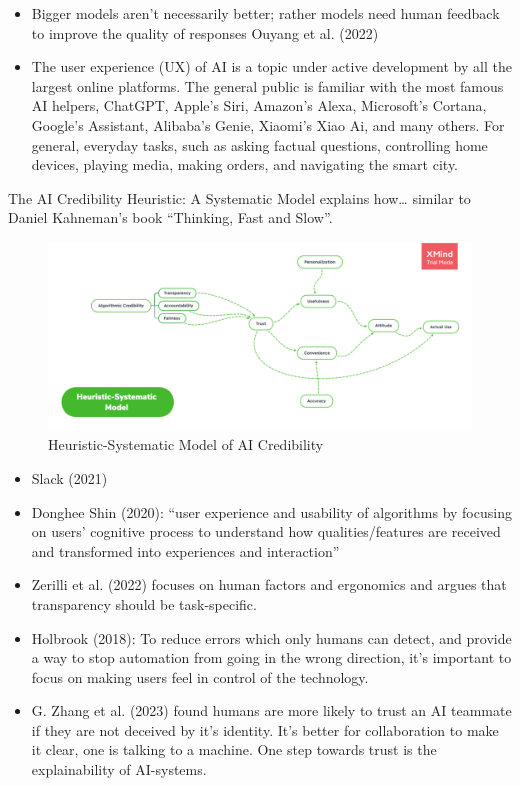 \documentclass[
  letterpaper,
  DIV=11,
  numbers=noendperiod]{scrartcl}
\begin{document}
\begin{itemize}
\item
  Bigger models aren't necessarily better; rather models need human
  feedback to improve the quality of responses Ouyang et al. (2022)
\item
  The user experience (UX) of AI is a topic under active development by
  all the largest online platforms. The general public is familiar with
  the most famous AI helpers, ChatGPT, Apple's Siri, Amazon's Alexa,
  Microsoft's Cortana, Google's Assistant, Alibaba's Genie, Xiaomi's
  Xiao Ai, and many others. For general, everyday tasks, such as asking
  factual questions, controlling home devices, playing media, making
  orders, and navigating the smart city.
\end{itemize}

The AI Credibility Heuristic: A Systematic Model explains how\ldots{}
similar to Daniel Kahneman's book ``Thinking, Fast and Slow''.

\begin{figure}[H]

{\centering \includegraphics[width=1\linewidth,height=\textheight,keepaspectratio]{./images/ai/ai-credibility.png}

}

\caption{Heuristic-Systematic Model of AI Credibility}

\end{figure}%

\begin{itemize}
\item
  Slack (2021)
\item
  Donghee Shin (2020): ``user experience and usability of algorithms by
  focusing on users' cognitive process to understand how
  qualities/features are received and transformed into experiences and
  interaction''
\item
  Zerilli et al. (2022) focuses on human factors and ergonomics and
  argues that transparency should be task-specific.
\item
  Holbrook (2018): To reduce errors which only humans can detect, and
  provide a way to stop automation from going in the wrong direction,
  it's important to focus on making users feel in control of the
  technology.
\item
  G. Zhang et al. (2023) found humans are more likely to trust an AI
  teammate if they are not deceived by it's identity. It's better for
  collaboration to make it clear, one is talking to a machine. One step
  towards trust is the explainability of AI-systems.
\end{itemize}
\end{document}
